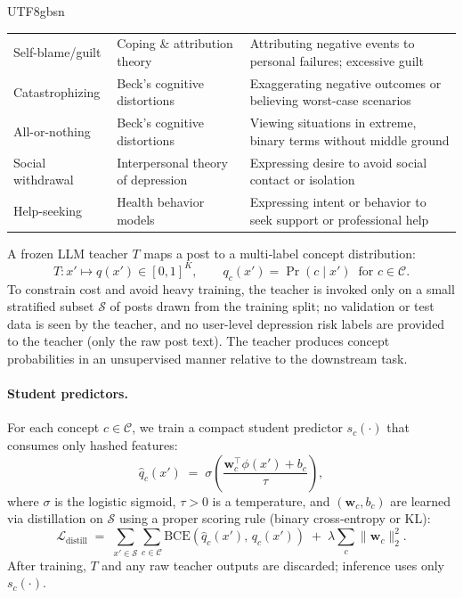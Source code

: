 \documentclass[lettersize,journal]{IEEEtran}
\begin{document}
\begin{CJK*}{UTF8}{gbsn}
\begin{table}[t]
{\begin{tabular}{p{2.2cm}p{3cm}p{5cm}}
Self-blame/guilt & Coping \& attribution theory & Attributing negative events to personal failures; excessive guilt \\
Catastrophizing & Beck's cognitive distortions & Exaggerating negative outcomes or believing worst-case scenarios \\
All-or-nothing & Beck's cognitive distortions & Viewing situations in extreme, binary terms without middle ground \\
Social withdrawal & Interpersonal theory of depression & Expressing desire to avoid social contact or isolation \\
Help-seeking & Health behavior models & Expressing intent or behavior to seek support or professional help \\
\bottomrule
\end{tabular}
}
\end{table}
A frozen LLM teacher $T$ maps a post to a multi‑label concept distribution:
\begin{equation}
    T: x' \mapsto q(x') \in [0,1]^K, \qquad q_c(x') = \Pr(c \mid x') \;\; \text{for } c \in \mathcal{C}.
\end{equation}
To constrain cost and avoid heavy training, the teacher is invoked only on a small stratified subset $\mathcal{S}$ of posts drawn from the training split; no validation or test data is seen by the teacher, and no user-level depression risk labels are provided to the teacher (only the raw post text). The teacher produces concept probabilities in an unsupervised manner relative to the downstream task. 

\paragraph{Student predictors.}
For each concept $c \in \mathcal{C}$, we train a compact student predictor $s_c(\cdot)$ that consumes only hashed features:
\begin{equation}
    \hat{q}_c(x') \;=\; \sigma\!\left(\frac{\mathbf{w}_c^\top \phi(x') + b_c}{\tau}\right),
\end{equation}
where $\sigma$ is the logistic sigmoid, $\tau>0$ is a temperature, and $(\mathbf{w}_c,b_c)$ are learned via distillation on $\mathcal{S}$ using a proper scoring rule (binary cross‑entropy or KL):
\begin{equation}
    \mathcal{L}_{\text{distill}} 
    \;=\; \sum_{x' \in \mathcal{S}} \sum_{c \in \mathcal{C}} 
    \mathrm{BCE}\!\left(\hat{q}_c(x'),\, q_c(x')\right) \;+\; \lambda \sum_{c}\lVert \mathbf{w}_c \rVert_2^2 .
\end{equation}
After training, $T$ and any raw teacher outputs are discarded; inference uses only $s_c(\cdot)$.


\end{CJK*}
\end{document}
